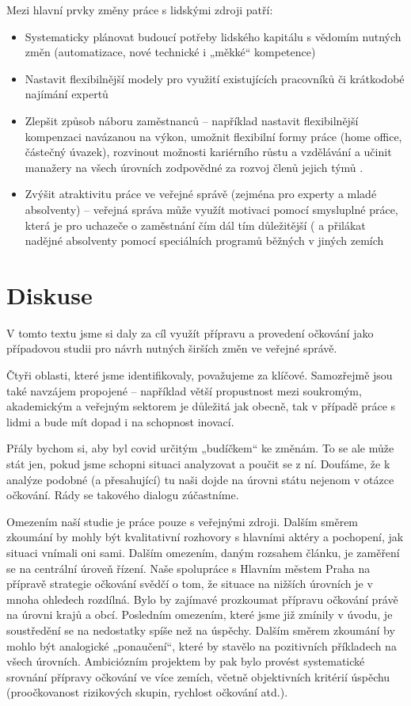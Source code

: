 Mezi hlavní prvky změny práce s lidskými zdroji patří:

\begin{itemize}
  \item Systematicky plánovat budoucí potřeby lidského kapitálu s vědomím nutných změn (automatizace, nové technické i „měkké“ kompetence)
  \item Nastavit flexibilnější modely pro využití existujících pracovníků či krátkodobé najímání expertů
  \item Zlepšit způsob náboru zaměstnanců -- například nastavit flexibilnější kompenzaci navázanou na výkon, umožnit flexibilní formy práce (home office, částečný úvazek), rozvinout možnosti kariérního růstu a vzdělávání a učinit manažery na všech úrovních zodpovědné za rozvoj členů jejich týmů \cite{thomas_finding_2021, mckinsey_desetileti_2021}.
  \item  Zvýšit atraktivitu práce ve veřejné správě (zejména pro experty a mladé absolventy) -- veřejná správa může využít motivaci pomocí smysluplné práce, která je pro uchazeče o zaměstnání čím dál tím důležitější (\cite{achor_9_2018} a přilákat nadějné absolventy pomocí speciálních programů běžných v jiných zemích \cite{noauthor_home_2020, mckinsey_desetileti_2021}
\end{itemize}

\section*{Diskuse}

V tomto textu jsme si daly za cíl využít přípravu a provedení očkování jako případovou studii pro návrh nutných širších změn ve veřejné správě.

Čtyři oblasti, které jsme identifikovaly, považujeme za klíčové. Samozřejmě jsou také navzájem propojené -- například větší propustnost mezi soukromým, akademickým a veřejným sektorem je důležitá jak obecně, tak v případě práce s lidmi a bude mít dopad i na schopnost inovací.

Přály bychom si, aby byl covid určitým „budíčkem“ ke změnám. To se ale může stát jen, pokud jsme schopni situaci analyzovat a poučit se z ní. Doufáme, že k analýze podobné (a přesahující) tu naši dojde na úrovni státu nejenom v otázce očkování. Rády se takového dialogu zúčastníme.

Omezením naší studie je práce pouze s veřejnými zdroji. Dalším směrem zkoumání by mohly být kvalitativní rozhovory s hlavními aktéry a pochopení, jak situaci vnímali oni sami. Dalším omezením, daným rozsahem článku, je zaměření se na centrální úroveň řízení. Naše spolupráce s Hlavním městem Praha na přípravě strategie očkování \cite{hygienicka_stanice_praha_2021} svědčí o tom, že situace na nižších úrovních je v mnoha ohledech rozdílná. Bylo by zajímavé prozkoumat přípravu očkování právě na úrovni krajů a obcí. Posledním omezením, které jsme již zmínily v úvodu, je soustředění se na nedostatky spíše než na úspěchy. Dalším směrem zkoumání by mohlo být analogické „ponaučení“, které by stavělo na pozitivních příkladech na všech úrovních. Ambiciózním projektem by pak bylo provést systematické srovnání přípravy očkování ve více zemích, včetně objektivních kritérií úspěchu (proočkovanost rizikových skupin, rychlost očkování atd.).

